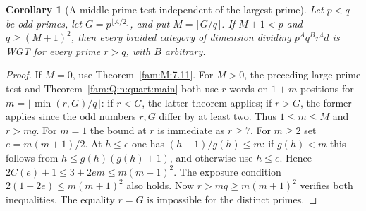 \documentclass[11pt,a4paper]{article}
\numberwithin{equation}{section}
\newtheorem{corollary}[theorem]{Corollary}
\theoremstyle{remark}
\begin{document}
\begin{corollary}[A middle-prime test independent of the largest prime]\label{fam:Q:4.3}\label{fam:Q:n:q13:midtest}
Let $p<q$ be odd primes, let $G=p^{\lfloor A/2\rfloor}$, and put
$M=\lfloor G/q\rfloor$. If $M+1<p$ and $q\ge(M+1)^2$,
then every braided category of dimension dividing $p^Aq^Br^4d$ is WGT for \emph{every}
prime $r>q$, with $B$ arbitrary.
\end{corollary}
\begin{proof}
If $M=0$, use Theorem~\ref{fam:M:7.11}. For $M>0$, the
preceding large-prime test and Theorem~\ref{fam:Q:n:quart:main} both use
$r$-words on $1+m$ positions for $m=\lfloor\min(r,G)/q\rfloor$:
if $r<G$, the latter theorem applies; if $r>G$, the former
applies since the odd numbers $r,G$ differ by at least two.
Thus $1\le m\le M$ and $r>mq$. For $m=1$ the bound at $r$
is immediate as $r\ge7$. For $m\ge2$ set $e=m(m+1)/2$. At
$h\le e$ one has $(h-1)/g(h)\le m$: if $g(h)<m$ this follows
from $h\le g(h)(g(h)+1)$, and otherwise use $h\le e$.
Hence $2C(e)+1\le 3+2em\le m(m+1)^2$. The exposure condition
$2(1+2e)\le m(m+1)^2$ also holds. Now
$r>mq\ge m(m+1)^2$ verifies both inequalities. The equality
$r=G$ is impossible for the distinct primes.
\end{proof}
\end{document}

